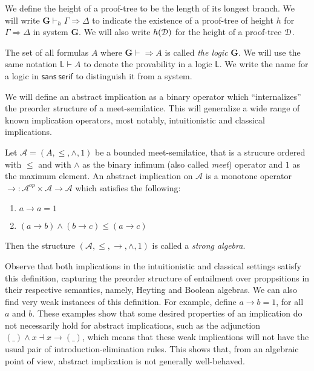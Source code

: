 We define the height of a proof-tree to be the length of its longest branch.
We will write $\mathbf{G} \vdash_h \Gamma \Rightarrow \Delta$ to indicate the existence of a proof-tree of height $h$ for $\Gamma \Rightarrow \Delta$ in system $\mathbf{G}$. We will also write $h(\mathcal{D})$ for the height of a proof-tree $\mathcal{D}$.

The set of all formulas $A$ where $\mathbf{G} \vdash \Rightarrow A$ is called \emph{the logic} $\mathbf{G}$. We will use the same notation $\mathsf{L} \vdash A$ to denote the provability in a logic $\mathsf{L}$. We write the name for a logic in $\mathsf{sans~serif}$ to distinguish it from a system.

We will define an abstract implication as a binary operator which ``internalizes'' the preorder structure of a meet-semilatice. This will generalize a wide range of known implication operators, most notably, intuitionistic and classical implications.
\begin{dfn}
  Let $\mathcal{A} = (A, \le, \wedge, 1)$ be a bounded meet-semilatice, that is a strucure ordered with $\le$ and with $\wedge$ as the binary infimum (also called \emph{meet}) operator and $1$ as the maximum element. An abstract implication on $\mathcal{A}$ is a monotone operator $\rightarrow : \mathcal{A}^{op} \times \mathcal{A} \rightarrow \mathcal{A}$ which satisfies the following:
  \begin{enumerate}
    \item $a \rightarrow a = 1$
    \item $(a \rightarrow b) \wedge (b \rightarrow c) \le (a \rightarrow c)$
  \end{enumerate}
  Then the structure $(\mathcal{A}, \le, \rightarrow, \wedge, 1)$ is called a \emph{strong algebra}.
  \end{dfn}
  Observe that both implications in the intuitionistic and classical settings satisfy this definition, capturing the preorder structure of entailment over proppsitions in their respective semantics, namely, Heyting and Boolean algebras. We can also find very weak instances of this definition. For example, define $a \rightarrow b = 1$, for all $a$ and $b$. These examples show that some desired properties of an implication do not necessarily hold for abstract implications, such as the adjunction $(\_) \wedge x \dashv x \rightarrow (\_)$, which means that these weak implications will not have the usual pair of introduction-elimination rules. This shows that, from an algebraic point of view, abstract implication is not generally well-behaved.
  
